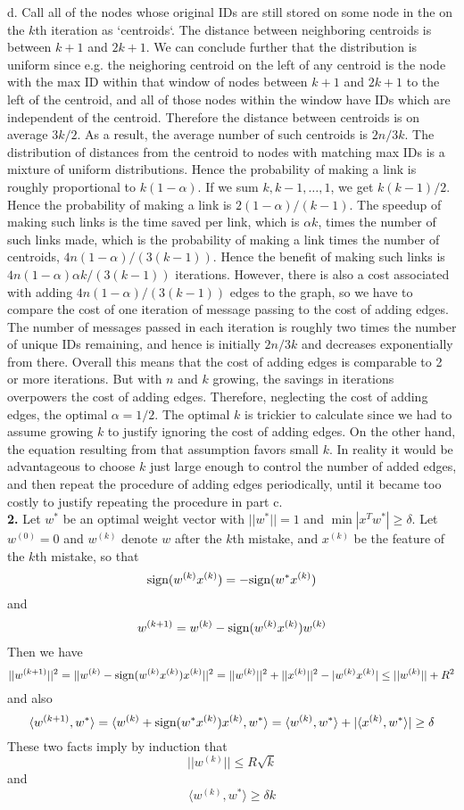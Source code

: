 \documentclass[11pt]{article}
\begin{document}
d.  Call all of the nodes whose original IDs are still stored on some
node in the on the $k$th iteration as `centroids`.  The distance
between neighboring centroids is between $k+1$ and $2k + 1$.  We can
conclude further that the distribution is uniform since e.g. the
neighoring centroid on the left of any centroid is the node with the
max ID within that window of nodes between $k+1$ and $2k+1$ to the
left of the centroid, and all of those nodes within the window have
IDs which are independent of the centroid.  Therefore the distance
between centroids is on average $3k/2$.  As a result, the average
number of such centroids is $2n/3k$.  The distribution of distances
from the centroid to nodes with matching max IDs is a mixture of
uniform distributions.  Hence the probability of making a link is
roughly proportional to $k(1-\alpha)$.  If we sum $k, k-1, \hdots, 1$,
we get $k(k-1)/2$.  Hence the probability of making a link is
$2(1-\alpha)/(k-1)$.  The speedup of making such links is the time
saved per link, which is $\alpha k$, times the number of such links
made, which is the probability of making a link times the number of
centroids, $4n(1-\alpha)/(3(k-1))$.  Hence the benefit of making such
links is $4n(1-\alpha)\alpha k/(3(k-1))$ iterations.  However, there
is also a cost associated with adding $4n(1-\alpha)/(3(k-1))$ edges to
the graph, so we have to compare the cost of one iteration of message
passing to the cost of adding edges.  The number of messages passed in
each iteration is roughly two times the number of unique IDs
remaining, and hence is initially $2n/3k$ and decreases exponentially
from there.  Overall this means that the cost of adding edges is
comparable to 2 or more iterations.  But with $n$ and $k$ growing, the
savings in iterations overpowers the cost of adding edges.  Therefore,
neglecting the cost of adding edges, the optimal $\alpha = 1/2$.  The
optimal $k$ is trickier to calculate since we had to assume growing
$k$ to justify ignoring the cost of adding edges.  On the other hand,
the equation resulting from that assumption favors small $k$.  In
reality it would be advantageous to choose $k$ just large enough to
control the number of added edges, and then repeat the procedure of
adding edges periodically, until it became too costly to justify
repeating the procedure in part c.\\


\noindent\textbf{2.}
Let $w^*$ be an optimal weight vector with $||w^*||=1$ and $\min |x^T w^*| \geq \delta$.
Let $w^{(0)} = 0$ and $w^{(k)}$ denote $w$ after the $k$th mistake, and $x^{(k)}$ be the feature of the $k$th mistake,
so that
\[
\text{sign}(w^{(k)} x^{(k)}) = -\text{sign}(w^* x^{(k)})
\]
and
\[
w^{(k+1)} = w^{(k)} - \text{sign}(w^{(k)} x^{(k)}) w^{(k)}
\]
Then we have
\[
||w^{(k+1)}||^2 = ||w^{(k)} - \text{sign}(w^{(k)} x^{(k)}) x^{(k)}||^2 = ||w^{(k)}||^2 + ||x^{(k)}||^2 - |w^{(k)} x^{(k)}| \leq ||w^{(k)}|| + R^2
\]
and also
\[
\langle w^{(k+1)}, w^* \rangle = \langle w^{(k)} +\text{sign}(w^* x^{(k)})x^{(k)} , w^* \rangle = \langle w^{(k)}, w^* \rangle + |\langle x^{(k)}, w^* \rangle| \geq \delta
\]
These two facts imply by induction that
\[
||w^{(k)}|| \leq R\sqrt{k}
\]
and
\[
\langle w^{(k)}, w^* \rangle \geq \delta k
\]
\end{document}
